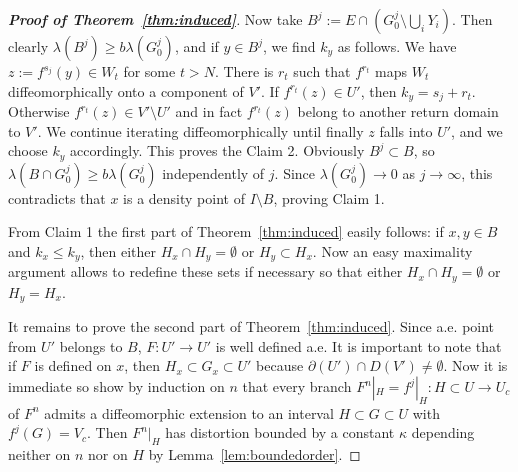 \documentclass[12pt, psamsfonts, reqno]{amsart}
\begin{document}
\begin{proof}[\textbf{Proof of Theorem~\ref{thm:induced}}]
Now take $B^j:= E\cap(G^j_0\setminus \bigcup_i Y_i)$. Then clearly
$\lambda(B^j) \geq b \lambda(G^j_0)$, and if $y \in B^j$, we find
$k_y$ as follows. We have $z := f^{s_j}(y) \in W_t$ for some $t >
N$. There is $r_t$ such that $f^{r_t}$ maps $W_t$
diffeomorphically onto a component of $V'$. If $f^{r_t}(z) \in
U'$, then $k_y = s_j +r_t$. Otherwise $f^{r_t}(z) \in V' \setminus
U'$ and in fact $f^{r_t}(z)$ belong to another return domain to
$V'$. We continue iterating diffeomorphically until finally $z$
falls into $U'$, and we choose $k_y$ accordingly. This proves the
Claim 2. Obviously $B^j \subset B$, so $\lambda(B \cap G^j_0) \geq
b\lambda(G^j_0)$ independently of $j$. Since $\lambda(G^j_0) \to
0$ as $j \to \infty$, this contradicts that $x$ is a density point
of $I \setminus B$, proving Claim 1.

From Claim 1 the first part of Theorem~\ref{thm:induced} easily
follows: if $x,y\in B$ and $k_x\leq k_y$, then either $H_x\cap
H_y=\emptyset$ or $H_y\subset H_x$. Now an easy maximality
argument allows to redefine these sets if necessary so that either
$H_x\cap H_y=\emptyset$ or $H_y=H_x$.

It remains to prove the second part of Theorem~\ref{thm:induced}.
Since a.e. point from $U'$ belongs to $B$, $F:U'\to U'$ is well
defined a.e. It is important to note that if $F$ is defined on
$x$, then $H_x\subset G_x\subset U'$ because $\partial(U')\cap
D(V')\neq \emptyset$. Now it is immediate so show by induction on
$n$ that every branch $F^n|_H=f^j|_H:H\subset U\to U_c$ of $F^n$
admits a diffeomorphic extension to an interval $H\subset G\subset
U$ with $f^j(G)=V_c$. Then $F^n|_H$ has distortion bounded by a
constant $\kappa$ depending neither on $n$ nor on $H$ by
Lemma~\ref{lem:boundedorder}.
\end{proof}
\end{document}
